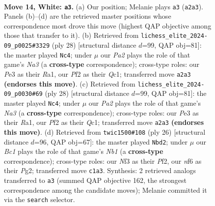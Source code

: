 \documentclass[11pt]{article}
\begin{document}
\begin{figure}[p]\centering
\begin{subfigure}{0.46\textwidth}\centering
\resizebox{\linewidth}{!}{%
\newchessgame
\chessboard[
  setfen={rnb1kr2/p3b1pp/1ppq1n2/3p1p2/3P3P/1P2PNPB/P3QP2/RNB1R1K1 w - - 3 14},
  showmover=false,
  pgfstyle=straightmove, color=movearrow, markmove={a2-a3}
]}
\caption{}
\end{subfigure}\hfill
\begin{subfigure}{0.46\textwidth}\centering
\resizebox{\linewidth}{!}{%
\newchessgame
\chessboard[
  setfen={rnr3k1/1p1bbppp/3ppn2/q7/p2P1B2/N1P2N1P/PP2BPP1/R1Q1R1K1 w - - 7 15},
  showmover=false,
  pgfstyle=straightmove, color=movearrow, markmove={a3-c4}
]}
\caption{}
\end{subfigure}
\\[4pt]
\begin{subfigure}{0.46\textwidth}\centering
\resizebox{\linewidth}{!}{%
\newchessgame
\chessboard[
  setfen={rnr3k1/1p1bbppp/3ppn2/q7/p2P1B2/N1P2N1P/PP2BPP1/R1Q1R1K1 w - - 7 15},
  showmover=false,
  pgfstyle=straightmove, color=movearrow, markmove={a3-c4}
]}
\caption{}
\end{subfigure}\hfill
\begin{subfigure}{0.46\textwidth}\centering
\resizebox{\linewidth}{!}{%
\newchessgame
\chessboard[
  setfen={r2nqrk1/ppp1b1p1/3ppn1p/4p3/PP2P3/1QPP1NBP/5PP1/RN2K2R w KQ - 3 14},
  showmover=false,
  pgfstyle=straightmove, color=movearrow, markmove={b1-d2}
]}
\caption{}
\end{subfigure}
\caption{\textbf{Move 14, White: \texttt{a3}.} (a) Our position; Melanie plays \texttt{a3} (\texttt{a2a3}). Panels (b)--(d) are the retrieved master positions whose correspondence most drove this move (highest QAP objective among those that transfer to it). (b) Retrieved from \texttt{lichess\_elite\_2024-09\_p0025\#3329} (ply 28) [structural distance $d$=99, QAP obj=81]: the master played \texttt{Nc4}; under $\mu$ our \emph{Pa2} plays the role of that game's \emph{Na3} (a \textbf{cross-type} correspondence); cross-type roles: our \emph{P}e3 as their \emph{R}a1, our \emph{P}f2 as their \emph{Q}c1; transferred move \texttt{a2a3} \textbf{(endorses this move)}. (c) Retrieved from \texttt{lichess\_elite\_2024-09\_p0030\#69} (ply 28) [structural distance $d$=99, QAP obj=81]: the master played \texttt{Nc4}; under $\mu$ our \emph{Pa2} plays the role of that game's \emph{Na3} (a \textbf{cross-type} correspondence); cross-type roles: our \emph{P}e3 as their \emph{R}a1, our \emph{P}f2 as their \emph{Q}c1; transferred move \texttt{a2a3} \textbf{(endorses this move)}. (d) Retrieved from \texttt{twic1500\#108} (ply 26) [structural distance $d$=96, QAP obj=67]: the master played \texttt{Nbd2}; under $\mu$ our \emph{Bc1} plays the role of that game's \emph{Nb1} (a \textbf{cross-type} correspondence); cross-type roles: our \emph{N}f3 as their \emph{P}f2, our \emph{n}f6 as their \emph{P}g2; transferred move \texttt{c1a3}. Synthesis: 2 retrieved analogs transferred to \texttt{a3} (summed QAP objective 162, the strongest correspondence among the candidate moves); Melanie committed it via the \texttt{search} selector.}
\label{fig:thought-m26}
\end{figure}
\end{document}
